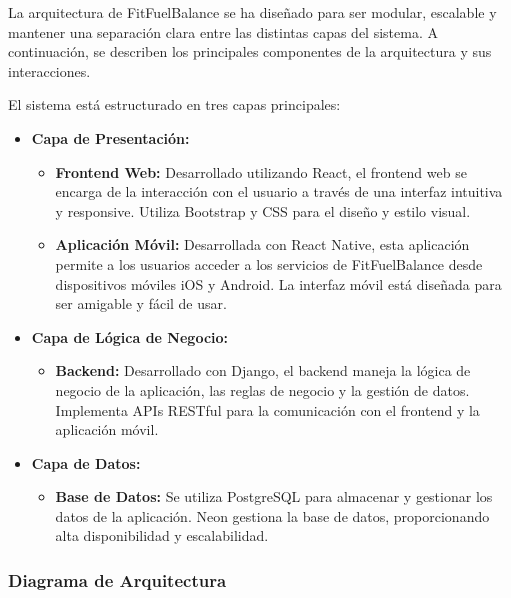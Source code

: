 La arquitectura de FitFuelBalance se ha diseñado para ser modular, escalable y mantener una separación clara entre las distintas capas del sistema. A continuación, se describen los principales componentes de la arquitectura y sus interacciones.

El sistema está estructurado en tres capas principales: 

\begin{itemize}
    \item \textbf{Capa de Presentación:} 
    \begin{itemize}
        \item \textbf{Frontend Web:} Desarrollado utilizando React, el frontend web se encarga de la interacción con el usuario a través de una interfaz intuitiva y responsive. Utiliza Bootstrap y CSS para el diseño y estilo visual.
        \item \textbf{Aplicación Móvil:} Desarrollada con React Native, esta aplicación permite a los usuarios acceder a los servicios de FitFuelBalance desde dispositivos móviles iOS y Android. La interfaz móvil está diseñada para ser amigable y fácil de usar.
    \end{itemize}
    
    \item \textbf{Capa de Lógica de Negocio:} 
    \begin{itemize}
        \item \textbf{Backend:} Desarrollado con Django, el backend maneja la lógica de negocio de la aplicación, las reglas de negocio y la gestión de datos. Implementa APIs RESTful para la comunicación con el frontend y la aplicación móvil.
    \end{itemize}
    
    \item \textbf{Capa de Datos:} 
    \begin{itemize}
        \item \textbf{Base de Datos:} Se utiliza PostgreSQL para almacenar y gestionar los datos de la aplicación. Neon gestiona la base de datos, proporcionando alta disponibilidad y escalabilidad.
    \end{itemize}
    
\end{itemize}

\subsubsection{Diagrama de Arquitectura}

